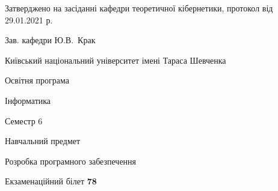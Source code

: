 \documentclass[10pt, ukrainian]{article}
\begin{document}
{\vspace{5mm}\smallskip \begin {small} Затверджено на засіданні кафедри теоретичної кібернетики, протокол  від   29.01.2021 р.\par\smallskip\smallskip
{\parbox {6.5 cm}{Зав. кафедри \dotfill Ю.В.~Крак}} \end{small}}
\newpage

{{\begin {small}\par
{ \center  Київський національний університет імені Тараса Шевченка \par}
{\parbox {5 cm}{Освітня програма \hfill}{\parbox {7 cm}{Інформатика \hfill}}\parbox {6 cm}{\hfill Семестр 6}}\par
{\parbox {5 cm} {Навчальний предмет \hfill}\parbox {7 cm}{Розробка програмного забезпечення \hfill}\parbox {6cm}{\hfill}\par}\vspace{-7pt} \end{small}}{\center Екзаменаційний білет \No \textbf
{ 78 }\par}}
\end{document}
